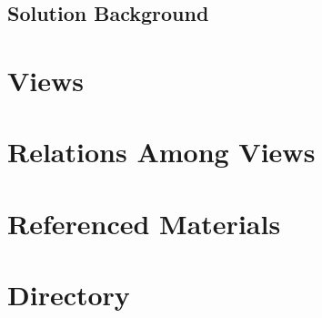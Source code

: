 \documentclass[10pt,letterpaper]{article}
\begin{document}
\subsection{Solution Background}\label{sec:solution-bg}






\section{Views}\label{sec:views}





\section{Relations Among Views}\label{sec:relations}


\section{Referenced Materials}\label{sec:references}


\section{Directory}\label{sec:directory}



\end{document}
